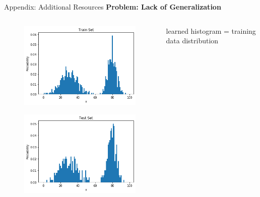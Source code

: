 \begin{frame}[allowframebreaks]{Appendix: Additional Resources}
\large
\textbf{Problem: Lack of Generalization}
\normalsize
\begin{columns}
    \begin{column}{0.45\textwidth}
        \begin{figure}
            \centering
            \includegraphics[width=\textwidth,keepaspectratio]{images/autoregressive/histogram_training.png}
        \end{figure}
        \begin{figure}
            \centering
            \includegraphics[width=\textwidth,keepaspectratio]{images/autoregressive/histogram_test.png}
        \end{figure}
    \end{column}
    \begin{column}{0.55\textwidth}
       learned histogram = training data distribution 


\end{column}
\end{columns}
\end{frame}
